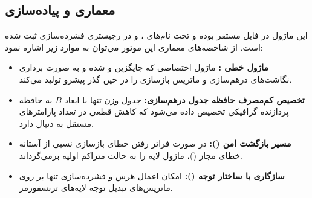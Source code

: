 \subsection{معماری و پیاده‌سازی}
این ماژول در فایل  مستقر بوده و تحت نام‌های ،  و  در رجیستری فشرده‌سازی ثبت شده است. از شاخصه‌های معماری این موتور می‌توان به موارد زیر اشاره نمود:
\begin{itemize}
    \item \textbf{ماژول خطی :} ماژول اختصاصی که جایگزین  و  شده و به صورت برداری نگاشت‌های درهم‌سازی و ماتریس بازسازی را در حین گذر پیشرو تولید می‌کند.
    \item \textbf{تخصیص کم‌مصرف حافظه جدول درهم‌سازی:} جدول وزن  تنها با ابعاد $B$ به حافظه پردازنده گرافیکی تخصیص داده می‌شود که کاهش قطعی در تعداد پارامترهای مستقل به دنبال دارد.
    \item \textbf{مسیر بازگشت امن ():} در صورت فراتر رفتن خطای بازسازی نسبی از آستانه خطای مجاز ()، ماژول لایه را به حالت متراکم اولیه برمی‌گرداند.
    \item \textbf{سازگاری با ساختار توجه ():} امکان اعمال هرس و فشرده‌سازی تنها بر روی ماتریس‌های تبدیل توجه لایه‌های ترنسفورمر.
\end{itemize}
